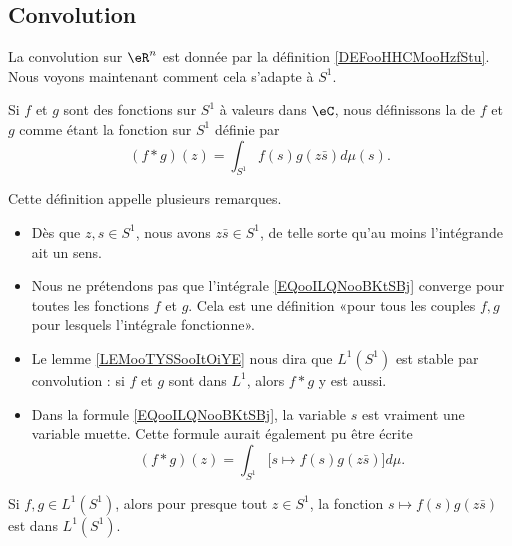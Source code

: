 \subsection{Convolution}

La convolution sur \( \eR^n\) est donnée par la définition \ref{DEFooHHCMooHzfStu}. Nous voyons maintenant comment cela s'adapte à \( S^1\).
\begin{definition}      \label{DEFooSKWOooEdIHoH}
    Si \( f\) et \( g\) sont des fonctions sur \( S^1\) à valeurs dans \( \eC\), nous définissons la  de \( f\) et \( g\) comme étant la fonction sur \( S^1\) définie par
    \begin{equation}        \label{EQooILQNooBKtSBj}
        (f*g)(z)=\int_{S^1}f(s)g(z\bar s)d\mu(s).
    \end{equation}
\end{definition}

Cette définition appelle plusieurs remarques.
\begin{itemize}
    \item
        Dès que \( z,s\in S^1\), nous avons \( z\bar s\in S^1\), de telle sorte qu'au moins l'intégrande ait un sens.
    \item Nous ne prétendons pas que l'intégrale \eqref{EQooILQNooBKtSBj} converge pour toutes les fonctions \( f\) et \( g\). Cela est une définition «pour tous les couples \( f,g\) pour lesquels l'intégrale fonctionne».
    \item
        Le lemme \ref{LEMooTYSSooItOiYE} nous dira que \( L^1(S^1)\) est stable par convolution : si \( f\) et \( g\) sont dans \( L^1\), alors \( f*g\) y est aussi.
    \item
        Dans la formule \eqref{EQooILQNooBKtSBj}, la variable \( s\) est vraiment une variable muette. Cette formule aurait également pu être écrite
    \begin{equation}        
        (f*g)(z)=\int_{S^1} \big[ s\mapsto f(s)g(z\bar s) \big]d\mu.
    \end{equation}
\end{itemize}

\begin{lemma}        \label{LEMooTYSSooItOiYE}
    Si \( f,g\in L^1(S^1)\), alors pour presque tout \( z\in S^1\), la fonction \( s\mapsto f(s)g(z\bar s)\) est dans \( L^1(S^1)\).
\end{lemma}

